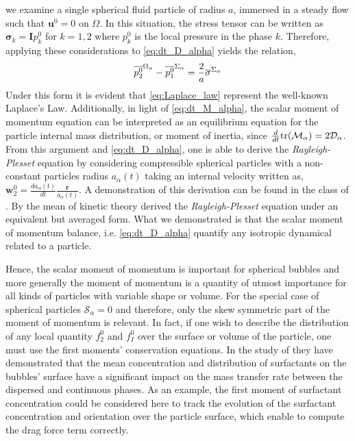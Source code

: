  we examine a single spherical fluid particle of radius $a$, immersed in a steady flow such that $\textbf{u}^0 = 0$ on $\Omega$. 
In this situation, the stress tensor can be written as $\bm{\sigma}_k = \textbf{I} p_k^0$ for $k = 1, 2$ where $p_k^0$ is the local pressure in the phase $k$. 
Therefore, applying these considerations to \ref{eq:dt_D_alpha} yields the relation, 
\begin{equation*}
    \overline{p_2^0}^{\Omega_\alpha} 
    - \overline{p_1^0}^{\Sigma_\alpha}
    =
    \frac{2}{a} \overline{\sigma}^{\Sigma_\alpha}
    \label{eq:Laplace_law}
\end{equation*}
Under this form it is evident that \ref{eq:Laplace_law} represent the well-known Laplace's Law. 
Additionally, in light of \ref{eq:dt_M_alpha}, the scalar moment of momentum equation can be interpreted as an equilibrium equation for the particle internal mass distribution, or moment of inertia, since $\frac{d}{d t}\text{tr}(\mathcal{M}_\alpha) = 2 \mathcal{D}_\alpha$. 
From this argument and \ref{eq:dt_D_alpha}, one is able to derive the \textit{Rayleigh-Plesset} equation by considering compressible spherical particles with a non-constant particles radius $a_\alpha(t)$ taking an internal velocity written as, $\textbf{w}^0_2 = \frac{d a_\alpha(t)}{dt}  \frac{\textbf{r}}{a_\alpha(t)}$. 
A demonstration of this derivation can be found in the class of . 
By the mean of kinetic theory \citet{zhang1994averaged} derived the \textit{Rayleigh-Plesset} equation under an equivalent but averaged form.
What we demonstrated is that the scalar moment of momentum balance, i.e. \ref{eq:dt_D_alpha} quantify any isotropic dynamical related to a particle. 

Hence, the scalar moment of momentum is important for spherical bubbles and more generally the moment of momentum is a quantity of utmost importance for all kinds of particles with variable shape or volume.
For the special case of spherical particles $\mathcal{S}_\alpha=0$ and therefore, only the skew symmetric part of the moment of momentum is relevant. 
In fact, if one wish to describe the distribution of any local quantity $f_2^0$ and $f_I^0$ over the surface or volume of the particle, one must use the first moments' conservation equations. 
In the  study of \citet{kentheswaran2022direct} they have demonstrated that the mean concentration and distribution of surfactants on the bubbles' surface have a significant impact on the mass transfer rate between the dispersed and continuous phases.
As an example, the first moment of surfactant concentration could be considered here to track the evolution of the surfactant concentration and orientation over the particle surface, which enable to compute the drag force term correctly.

